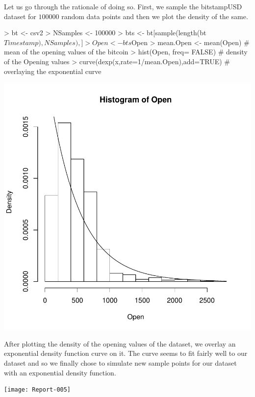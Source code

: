 \documentclass{article}
\begin{document}
Let us go through the rationale of doing so. First, we sample the bitstampUSD dataset for $100000$ random data points and then we plot the density of the same.

\begin{Schunk}
\begin{Sinput}
> bt <- csv2
> NSamples <- 100000
> bts <- bt[sample(length(bt$Timestamp),NSamples),]
> Open <- bts$Open
> mean.Open <- mean(Open)     # mean of the opening values of the bitcoin
> hist(Open, freq= FALSE)   # density of the Opening values
> curve(dexp(x,rate=1/mean.Open),add=TRUE)    # overlaying the exponential curve
\end{Sinput}
\end{Schunk}
\includegraphics{Report-004}

After plotting the density of the opening values of the dataset, we overlay an exponential density function curve on it. The curve seems to fit fairly well to our dataset and so we finally chose to simulate new sample points for our dataset with an exponential density function.

\begin{Schunk}
\end{Schunk}
\texttt{[image: Report-005]}
\end{document}
